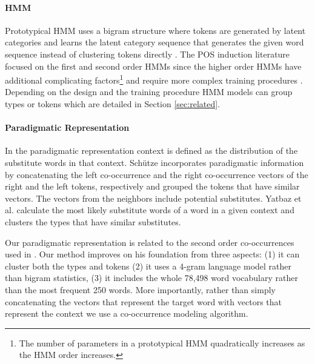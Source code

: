 \paragraph{HMM} 
Prototypical HMM uses a bigram structure where tokens are generated by
latent categories and learns the latent category sequence that
generates the given word sequence instead of clustering tokens
directly
\cite{Brown:1992:CNG:176313.176316,blunsom-cohn:2011:ACL-HLT2011,goldwater-griffiths:2007:ACLMain,johnson:2007:EMNLP-CoNLL2007,Ganchev:2010:PRS:1859890.1859918,bergkirkpatrick-klein:2010:ACL,Lee:2010:STU:1870658.1870741}.
The POS induction literature focused on the first and second order
HMMs since the higher order HMMs have additional complicating
factors\footnote{The number of parameters in a prototypical HMM
  quadratically increases as the HMM order increases.}  and require
more complex training procedures \cite{johnson:2007:EMNLP-CoNLL2007}.
Depending on the design and the training procedure HMM models can
group types or tokens which are detailed in Section \ref{sec:related}.

\paragraph{Paradigmatic Representation} 

In the paradigmatic representation context is defined as the
distribution of the substitute words in that context.  Sch\"{u}tze
 incorporates paradigmatic
information by concatenating the left co-occurrence and the right
co-occurrence vectors of the right and the left tokens, respectively
and grouped the tokens that have similar vectors.  The vectors from
the neighbors include potential substitutes.  Yatbaz et
al.  calculate the most
likely substitute words of a word in a given context and clusters the
types that have similar substitutes.

Our paradigmatic representation is related to the second order
co-occurrences used in \cite{Schutze:1995:DPT:976973.976994}.  Our
method improves on his foundation from three aspects: (1) it can
cluster both the types and tokens (2) it uses a 4-gram language model
rather than bigram statistics, (3) it includes the whole 78,498 word
vocabulary rather than the most frequent 250 words.  More importantly,
rather than simply concatenating the vectors that represent the target
word with vectors that represent the context we use a co-occurrence
modeling algorithm.

